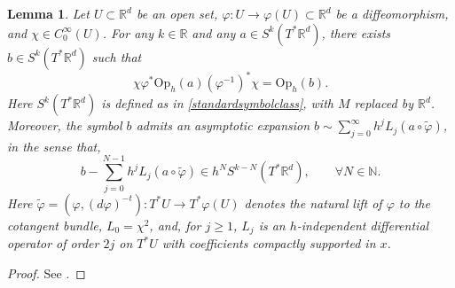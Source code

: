 \documentclass[11pt,oneside,reqno]{amsart}
\newcommand\R{\ensuremath{\mathbb{R}}}
\newtheorem{lemma}[theorem]{Lemma}
\theoremstyle{definition}
\numberwithin{equation}{section}
\theoremstyle{plain}
\begin{document}


\begin{lemma}\label{changevariable}
Let $U\subset \R^d$ be an open set, $\varphi: U \rightarrow \varphi(U) \subset \R^d$ be a diffeomorphism, and $\chi \in C_0^\infty(U)$. For any $k\in \mathbb{R}$ and any $a \in S^k (T^* \mathbb{R}^d )$, there exists $b \in S^k (T^* \mathbb{R}^d )$ such that
\begin{equation*}
    \chi \varphi^*\mathrm{Op}_h(a)(\varphi^{-1})^*\chi=\mathrm{Op}_h(b) .
\end{equation*}
Here $S^k\left(T^* \mathbb{R}^d\right)$ is defined as in \eqref{standardsymbolclass}, with $M$ replaced by $\R^d$. Moreover, the symbol $b$ admits an asymptotic expansion $b \sim \sum_{j=0}^{\infty} h^j L_j(a \circ \widetilde{\varphi})$, in the sense that,
\begin{equation*}
    b-\sum_{j=0}^{N-1} h^j L_j(a \circ \widetilde{\varphi})  \in h^N S^{k-N}(T^*\R^d), \qquad \forall N \in \mathbb{N}.
\end{equation*}
Here $\widetilde{\varphi}=(\varphi,(d\varphi)^{-t}): T^*U\to T^*\varphi(U)$ denotes the natural lift of $\varphi$ to the cotangent bundle, $L_0=\chi^2$, and, for $j\geq 1$, $L_j$ is an $h$-independent differential operator of order $2 j$ on $T^*U$ with coefficients compactly supported in $x$.
\end{lemma}
\begin{proof}
    See \cite[Proposition E.10]{dyatlovzworski2019resonances}.
\end{proof}
\end{document}
